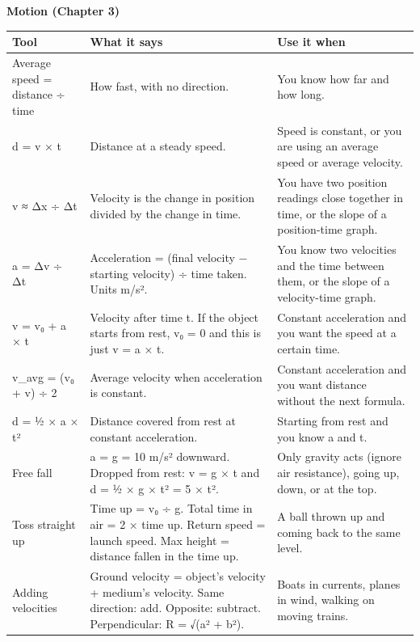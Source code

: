\documentclass[
]{article}
\newcounter{none} %
\begin{document}
\textbf{Motion (Chapter 3)}

{\def\LTcaptype{none} %
\begin{longtable}[]{@{}
  >{\raggedright\arraybackslash}p{}
  >{\raggedright\arraybackslash}p{}
  >{\raggedright\arraybackslash}p{}@{}}
\toprule\noalign{}
\begin{minipage}[b]{\linewidth}\raggedright
Tool
\end{minipage} & \begin{minipage}[b]{\linewidth}\raggedright
What it says
\end{minipage} & \begin{minipage}[b]{\linewidth}\raggedright
Use it when
\end{minipage} \\
\midrule\noalign{}
\endhead
\bottomrule\noalign{}
\endlastfoot
Average speed = distance ÷ time & How fast, with no direction. & You
know how far and how long. \\
d = v × t & Distance at a steady speed. & Speed is constant, or you are
using an average speed or average velocity. \\
v ≈ Δx ÷ Δt & Velocity is the change in position divided by the change
in time. & You have two position readings close together in time, or the
slope of a position-time graph. \\
a = Δv ÷ Δt & Acceleration = (final velocity − starting velocity) ÷ time
taken. Units m/s². & You know two velocities and the time between them,
or the slope of a velocity-time graph. \\
v = v₀ + a × t & Velocity after time t. If the object starts from rest,
v₀ = 0 and this is just v = a × t. & Constant acceleration and you want
the speed at a certain time. \\
v\_avg = (v₀ + v) ÷ 2 & Average velocity when acceleration is constant.
& Constant acceleration and you want distance without the next
formula. \\
d = ½ × a × t² & Distance covered from rest at constant acceleration. &
Starting from rest and you know a and t. \\
Free fall & a = g = 10 m/s² downward. Dropped from rest: v = g × t and d
= ½ × g × t² = 5 × t². & Only gravity acts (ignore air resistance),
going up, down, or at the top. \\
Toss straight up & Time up = v₀ ÷ g. Total time in air = 2 × time up.
Return speed = launch speed. Max height = distance fallen in the time
up. & A ball thrown up and coming back to the same level. \\
Adding velocities & Ground velocity = object's velocity + medium's
velocity. Same direction: add. Opposite: subtract. Perpendicular: R =
√(a² + b²). & Boats in currents, planes in wind, walking on moving
trains. \\
\end{longtable}
}
\end{document}
